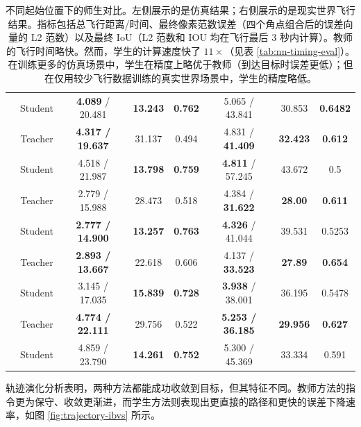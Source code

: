 \documentclass[10pt,twocolumn,letterpaper]{article}
\begin{document}
\begin{table}[htpb]
\begin{tabular}{c c c c c c c c}
                               & Student & \textbf{4.089} / 20.481 & \textbf{13.243} & \textbf{0.762} & 5.065 / 43.841 & 30.853 & \textbf{0.6482} \\
        \addlinespace
        \multirow{2}{*}{Right} & Teacher & \textbf{4.317 / 19.637} & 31.137 & 0.494 & 4.831 / \textbf{41.409} & \textbf{32.423} & \textbf{0.612}\\
                               & Student & 4.518 / 21.987 & \textbf{13.798} & \textbf{0.759} & \textbf{4.811} / 57.245 & 43.672 & 0.5 \\
        \addlinespace
        \multirow{2}{*}{Down-Left} & Teacher & 2.779 / 15.988 & 28.473 & 0.518 & 4.384 / \textbf{31.622} & \textbf{28.00} & \textbf{0.611}\\
                               & Student & \textbf{2.777 / 14.900} & \textbf{13.257} & \textbf{0.763} & \textbf{4.326} / 41.044 & 39.531 & 0.5253 \\
        \addlinespace
        \multirow{2}{*}{Down-Right} & Teacher & \textbf{2.893 / 13.667} & 22.618 & 0.606 & 4.137 / \textbf{33.523} & \textbf{27.89} & \textbf{0.654}\\
                               & Student & 3.145 / 17.035 & \textbf{15.839} & \textbf{0.728} & \textbf{3.938} / 38.001 & 36.195 & 0.5478 \\
        \bottomrule
        \addlinespace
        \multirow{2}{*}{Mean} & Teacher & \textbf{4.774 / 22.111} & 29.756 & 0.522 & \textbf{5.253 / 36.185} & \textbf{29.956} & \textbf{0.627}\\
                               & Student & 4.859 / 23.790 & \textbf{14.261} & \textbf{0.752} & 5.300 / 45.369 & 33.334 & 0.591 \\
        \bottomrule
    \end{tabular}
    \caption{不同起始位置下的师生对比。左侧展示的是仿真结果；右侧展示的是现实世界飞行结果。指标包括总飞行距离/时间、最终像素范数误差（四个角点组合后的误差向量的 L2 范数）以及最终 IoU（L2 范数和 IOU 均在飞行最后 3 秒内计算）。教师的飞行时间略快。然而，学生的计算速度快了 $11\times$（见表 \ref{tab:nn-timing-eval}）。在训练更多的仿真场景中，学生在精度上略优于教师（到达目标时误差更低）；但在仅用较少飞行数据训练的真实世界场景中，学生的精度略低。}
    \label{tab:teacher-student-metricwise}
\end{table}

轨迹演化分析表明，两种方法都能成功收敛到目标，但其特征不同。教师方法的指令更为保守、收敛更渐进，而学生方法则表现出更直接的路径和更快的误差下降速率，如图 \ref{fig:trajectory-ibvs} 所示。
\end{document}
